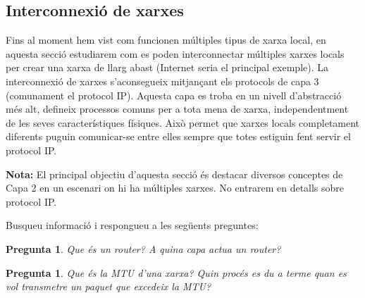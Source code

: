 \documentclass[12pt,a4paper]{article}
\newcounter{exercises}
\newtheorem{exer}[exercises]{Pregunta}
\begin{document}
\subsection{Interconnexió de xarxes}
Fins al moment hem vist com funcionen múltiples tipus de xarxa local, en aquesta secció estudiarem com es poden interconnectar múltiples xarxes locals per crear una xarxa de llarg abast (Internet seria el principal exemple). La interconnexió de xarxes s'aconsegueix mitjançant els protocols de capa 3 (comunament el protocol IP). Aquesta capa es troba en un nivell d'abstracció més alt, defineix processos comuns per a tota mena de xarxa, independentment de les seves característiques físiques. Això permet que xarxes locals completament diferents puguin comunicar-se entre elles sempre que totes estiguin fent servir el protocol IP.

\textbf{Nota:} El principal objectiu d'aquesta secció és destacar diversos conceptes de Capa 2 en un escenari on hi ha múltiples xarxes. No entrarem en detalls sobre protocol IP.

Busqueu informació i respongueu a les següents preguntes:
\begin{exer} Que és un router? A quina capa actua un router? \end{exer}
\begin{exer} Que és la MTU d'una xarxa? Quin procés es du a terme quan es vol transmetre un paquet
que excedeix la MTU?\end{exer}
\end{document}
